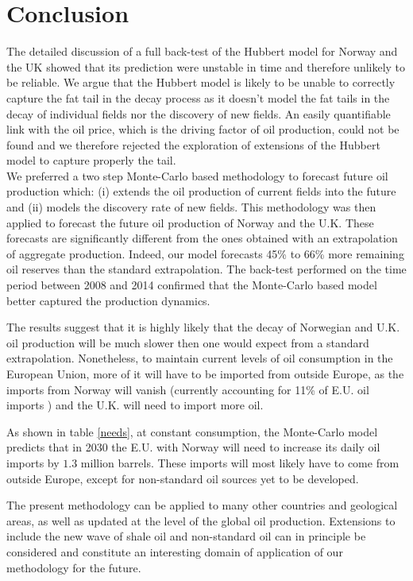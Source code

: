 \documentclass[review]{elsarticle}
\begin{document}
\section{Conclusion}

The detailed discussion of a full back-test of the Hubbert model for Norway and the UK showed that its prediction were unstable in time and therefore unlikely to be reliable. We argue that the Hubbert model is likely to be unable to correctly capture the fat tail in the decay process as it doesn't model the fat tails in the decay of individual fields nor the discovery of new fields. An easily quantifiable link with the oil price, which is the driving factor of oil production, could not be found and we therefore rejected the exploration of extensions of the Hubbert model to capture properly the tail.\\
We preferred a two step Monte-Carlo based methodology to forecast future oil production which: (i) extends the oil production of current fields into the future and (ii) models the discovery rate of new fields. This methodology was then applied to forecast the future oil production of Norway and the U.K. These forecasts are significantly different from the ones obtained with an extrapolation of aggregate production. Indeed, our model forecasts 45\% to 66\% more remaining oil reserves than the standard extrapolation. The back-test performed on the time period between 2008 and 2014 confirmed that the Monte-Carlo based model better captured the production dynamics.

The results suggest that it is highly likely that the decay
of Norwegian and U.K. oil production will be much slower then one
would expect from a standard extrapolation. Nonetheless, to maintain
current levels of oil consumption in the European Union, more of it
will have to be imported from outside Europe, as the imports from
Norway will vanish (currently accounting for 11\% of E.U. oil imports
) and the U.K. will need to import more
oil.

As shown in table \ref{needs}, at constant consumption, the Monte-Carlo
model predicts that in 2030 the E.U. with Norway will need to increase
its daily oil imports by $1.3$ million barrels. These imports will most
likely have to come from outside Europe, except for  
non-standard oil sources yet to be developed.


The present methodology can be applied to many other countries
and geological areas, as well as updated at the level of the global
oil production. Extensions to include the new wave of shale oil and
non-standard oil can in principle be considered and constitute
an interesting domain of application of our methodology for the future.
\end{document}
